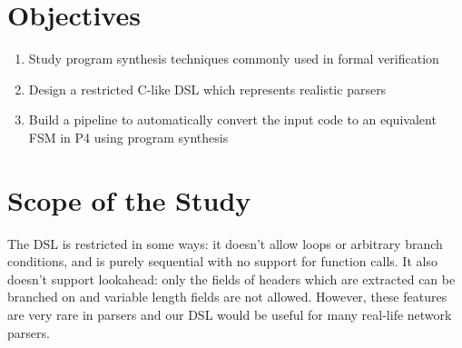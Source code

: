 \section{Objectives}
\label{sec:objectives}
\begin{enumerate}
    \item Study program synthesis techniques commonly used in formal verification
    \item Design a restricted C-like DSL which represents realistic parsers
    \item Build a pipeline to automatically convert the input code to an equivalent FSM in P4 using program synthesis
\end{enumerate}

\section{Scope of the Study}
\label{sec:scope}
The DSL is restricted in some ways: it doesn't allow loops or arbitrary branch conditions, and is purely sequential with no support for function calls. It  also doesn't support lookahead: only the fields of headers which are extracted can be branched on and variable length fields are not allowed. However, these features are very rare in parsers and our DSL would be useful for many real-life network parsers.


